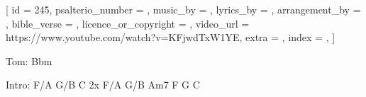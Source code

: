 
[
    id                     = {245},
    psalterio_number       = {},
    music_by               = {},
    lyrics_by              = {},
    arrangement_by         = {},
    bible_verse            = {},
    licence_or_copyright   = {},
    video_url              = {https://www.youtube.com/watch?v=KFjwdTxW1YE},
    extra                  = {},
    index                  = {},
]


\beginchorus

Tom: Bbm

Intro: F/A G/B C 2x
       F/A G/B Am7
       F G C

